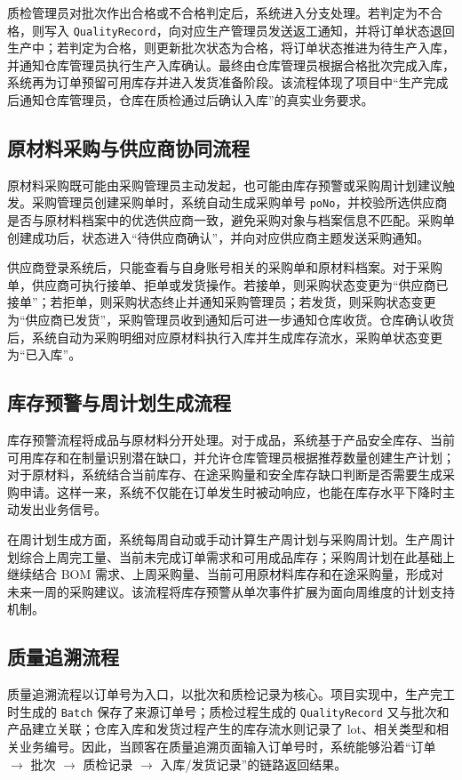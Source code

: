 质检管理员对批次作出合格或不合格判定后，系统进入分支处理。若判定为不合格，则写入 \texttt{QualityRecord}，向对应生产管理员发送返工通知，并将订单状态退回生产中；若判定为合格，则更新批次状态为合格，将订单状态推进为待生产入库，并通知仓库管理员执行生产入库确认。最终由仓库管理员根据合格批次完成入库，系统再为订单预留可用库存并进入发货准备阶段。该流程体现了项目中“生产完成后通知仓库管理员，仓库在质检通过后确认入库”的真实业务要求。

\subsection{原材料采购与供应商协同流程}

原材料采购既可能由采购管理员主动发起，也可能由库存预警或采购周计划建议触发。采购管理员创建采购单时，系统自动生成采购单号 \texttt{poNo}，并校验所选供应商是否与原材料档案中的优选供应商一致，避免采购对象与档案信息不匹配。采购单创建成功后，状态进入“待供应商确认”，并向对应供应商主题发送采购通知。

供应商登录系统后，只能查看与自身账号相关的采购单和原材料档案。对于采购单，供应商可执行接单、拒单或发货操作。若接单，则采购状态变更为“供应商已接单”；若拒单，则采购状态终止并通知采购管理员；若发货，则采购状态变更为“供应商已发货”，采购管理员收到通知后可进一步通知仓库收货。仓库确认收货后，系统自动为采购明细对应原材料执行入库并生成库存流水，采购单状态变更为“已入库”。

\subsection{库存预警与周计划生成流程}

库存预警流程将成品与原材料分开处理。对于成品，系统基于产品安全库存、当前可用库存和在制量识别潜在缺口，并允许仓库管理员根据推荐数量创建生产计划；对于原材料，系统结合当前库存、在途采购量和安全库存缺口判断是否需要生成采购申请。这样一来，系统不仅能在订单发生时被动响应，也能在库存水平下降时主动发出业务信号。

在周计划生成方面，系统每周自动或手动计算生产周计划与采购周计划。生产周计划综合上周完工量、当前未完成订单需求和可用成品库存；采购周计划在此基础上继续结合 BOM 需求、上周采购量、当前可用原材料库存和在途采购量，形成对未来一周的采购建议。该流程将库存预警从单次事件扩展为面向周维度的计划支持机制。

\subsection{质量追溯流程}

质量追溯流程以订单号为入口，以批次和质检记录为核心。项目实现中，生产完工时生成的 \texttt{Batch} 保存了来源订单号；质检过程生成的 \texttt{QualityRecord} 又与批次和产品建立关联；仓库入库和发货过程产生的库存流水则记录了 lot、相关类型和相关业务编号。因此，当顾客在质量追溯页面输入订单号时，系统能够沿着“订单 $\rightarrow$ 批次 $\rightarrow$ 质检记录 $\rightarrow$ 入库/发货记录”的链路返回结果。

